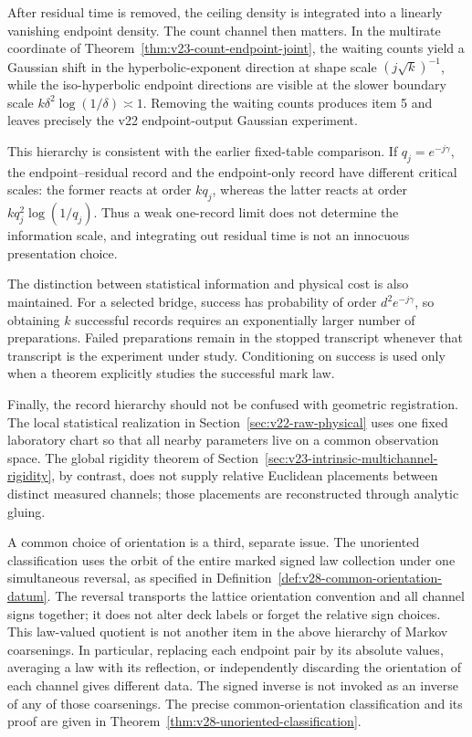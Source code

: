 After residual time is removed, the ceiling density is integrated into a
linearly vanishing endpoint density.  The count channel then matters.  In the
multirate coordinate of Theorem~\ref{thm:v23-count-endpoint-joint}, the waiting
counts yield a Gaussian shift in the hyperbolic-exponent direction at shape
scale \((j\sqrt k)^{-1}\), while the iso-hyperbolic endpoint directions are
visible at the slower boundary scale
\(k\delta^2\log(1/\delta)\asymp1\).  Removing the waiting counts produces item
5 and leaves precisely the v22 endpoint-output Gaussian experiment.

This hierarchy is consistent with the earlier fixed-table comparison.  If
\(q_j=e^{-j\gamma}\), the endpoint--residual record and the endpoint-only
record have different critical scales: the former reacts at order \(kq_j\),
whereas the latter reacts at order
\(kq_j^2\log(1/q_j)\).  Thus a weak one-record limit does not determine the
information scale, and integrating out residual time is not an innocuous
presentation choice.

The distinction between statistical information and physical cost is also
maintained.  For a selected bridge, success has probability of order
\(d^2e^{-j\gamma}\), so obtaining \(k\) successful records requires an
exponentially larger number of preparations.  Failed preparations remain in
the stopped transcript whenever that transcript is the experiment under
study.  Conditioning on success is used only when a theorem explicitly
studies the successful mark law.

Finally, the record hierarchy should not be confused with geometric
registration.  The local statistical realization in
Section~\ref{sec:v22-raw-physical} uses one fixed laboratory chart so that all
nearby parameters live on a common observation space.  The global rigidity
theorem of Section~\ref{sec:v23-intrinsic-multichannel-rigidity}, by contrast,
does not supply relative Euclidean placements between distinct measured
channels; those placements are reconstructed through analytic gluing.


A common choice of orientation is a third, separate issue.  The unoriented
classification uses the orbit of the entire marked signed law collection
under one simultaneous reversal, as specified in
Definition~\ref{def:v28-common-orientation-datum}.  The reversal transports the
lattice orientation convention and all channel signs together; it does not
alter deck labels or forget the relative sign choices.  This law-valued
quotient is not another item in the above hierarchy of Markov coarsenings.
In particular, replacing each endpoint pair by its absolute values, averaging
a law with its reflection, or independently discarding the orientation of
each channel gives different data.  The signed inverse is not invoked as an
inverse of any of those coarsenings.  The precise common-orientation
classification and its proof are given in
Theorem~\ref{thm:v28-unoriented-classification}.

